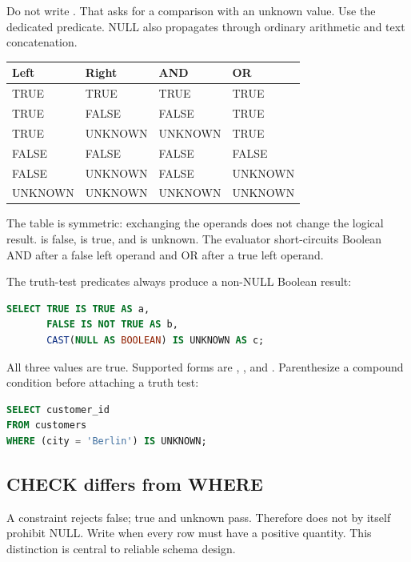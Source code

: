 Do not write . That asks for a comparison with an unknown value. Use the dedicated  predicate. NULL also propagates through ordinary arithmetic and text concatenation.

\begin{longtable}{p{.25\linewidth}p{.20\linewidth}p{.20\linewidth}p{.23\linewidth}}
\toprule
Left & Right & AND & OR \\
\midrule
\endhead
TRUE & TRUE & TRUE & TRUE \\
TRUE & FALSE & FALSE & TRUE \\
TRUE & UNKNOWN & UNKNOWN & TRUE \\
FALSE & FALSE & FALSE & FALSE \\
FALSE & UNKNOWN & FALSE & UNKNOWN \\
UNKNOWN & UNKNOWN & UNKNOWN & UNKNOWN \\
\bottomrule
\end{longtable}

The table is symmetric: exchanging the operands does not change the logical result.  is false,  is true, and  is unknown. The evaluator short-circuits Boolean AND after a false left operand and OR after a true left operand.

The truth-test predicates always produce a non-NULL Boolean result:

\begin{lstlisting}[language=SQL]
SELECT TRUE IS TRUE AS a,
       FALSE IS NOT TRUE AS b,
       CAST(NULL AS BOOLEAN) IS UNKNOWN AS c;
\end{lstlisting}

All three values are true. Supported forms are , , and . Parenthesize a compound condition before attaching a truth test:

\begin{lstlisting}[language=SQL]
SELECT customer_id
FROM customers
WHERE (city = 'Berlin') IS UNKNOWN;
\end{lstlisting}

\subsection{CHECK differs from WHERE}

A  constraint rejects false; true and unknown pass. Therefore  does not by itself prohibit NULL. Write  when every row must have a positive quantity. This distinction is central to reliable schema design.

